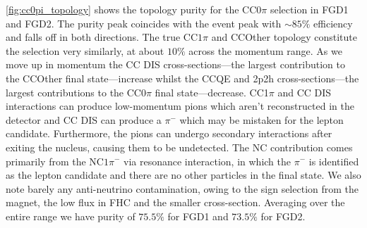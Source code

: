 \autoref{fig:cc0pi_topology} shows the topology purity for the CC0$\pi$ selection in FGD1 and FGD2. The purity peak coincides with the event peak with $\sim85\%$ efficiency and falls off in both directions. The true CC$1\pi$ and CCOther topology constitute the selection very similarly, at about $10\%$ across the momentum range. As we move up in momentum the CC DIS cross-sections---the largest contribution to the CCOther final state---increase whilst the CCQE and 2p2h cross-sections---the largest contributions to the CC0$\pi$ final state---decrease. CC1$\pi$ and CC DIS interactions can produce low-momentum pions which aren't reconstructed in the detector and CC DIS can produce a $\pi^-$ which may be mistaken for the lepton candidate. Furthermore, the pions can undergo secondary interactions after exiting the nucleus, causing them to be undetected. The NC contribution comes primarily from the NC$1\pi^-$ via resonance interaction, in which the $\pi^-$ is identified as the lepton candidate and there are no other particles in the final state. We also note barely any anti-neutrino contamination, owing to the sign selection from the magnet, the low \numubar flux in FHC and the smaller cross-section. Averaging over the entire range we have purity of $75.5\%$ for FGD1 and $73.5\%$ for FGD2.
